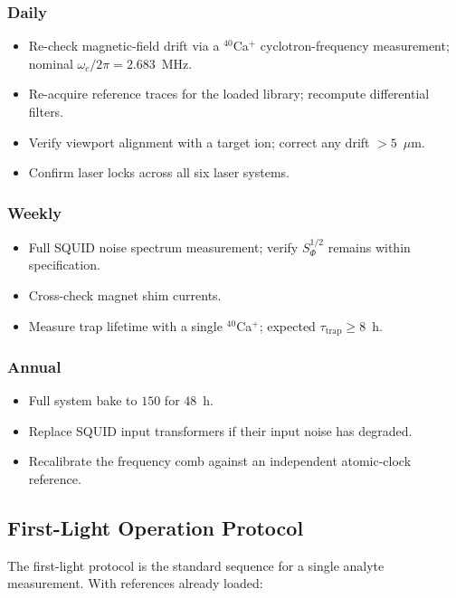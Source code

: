 \subsubsection{Daily}
\begin{itemize}[leftmargin=1.5em,nosep]
    \item Re-check magnetic-field drift via a $^{40}$Ca$^+$ cyclotron-frequency measurement; nominal $\omega_c/2\pi = 2.683$~MHz.
    \item Re-acquire reference traces for the loaded library; recompute differential filters.
    \item Verify viewport alignment with a target ion; correct any drift $> 5$~$\mu$m.
    \item Confirm laser locks across all six laser systems.
\end{itemize}

\subsubsection{Weekly}
\begin{itemize}[leftmargin=1.5em,nosep]
    \item Full SQUID noise spectrum measurement; verify $S_\Phi^{1/2}$ remains within specification.
    \item Cross-check magnet shim currents.
    \item Measure trap lifetime with a single $^{40}$Ca$^+$; expected $\tau_{\mathrm{trap}} \ge 8$~h.
\end{itemize}

\subsubsection{Annual}
\begin{itemize}[leftmargin=1.5em,nosep]
    \item Full system bake to $150$\textcelsius{} for $48$~h.
    \item Replace SQUID input transformers if their input noise has degraded.
    \item Recalibrate the frequency comb against an independent atomic-clock reference.
\end{itemize}

\subsection{First-Light Operation Protocol}
\label{subsec:first_light}

The first-light protocol is the standard sequence for a single analyte measurement. With references already loaded:

